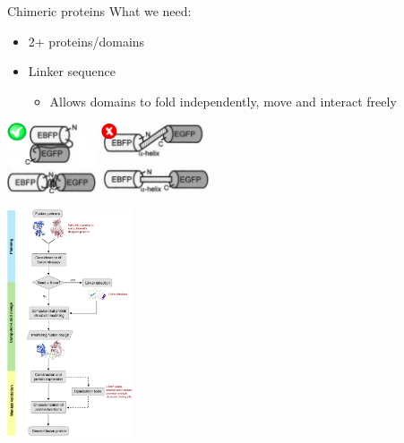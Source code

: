 \documentclass{beamer}
\begin{document}
\begin{frame}{Chimeric proteins}
What we need:
\begin{itemize}
 \item 2+ proteins/domains
 \item Linker sequence
 \begin{itemize}
    \pause
    \item Allows domains to fold independently, move and interact freely
\end{itemize}
\end{itemize}
\vspace{20px}
\pause
\hspace{20px}
\includegraphics[width=100px]{../img/linkerOk-sign.png}
\hspace{40px}
\pause
\includegraphics[width=120px]{../img/linkerBad-sign.png}
\end{frame}




\begin{frame}[plain]
\begin{center}
\includegraphics[width=140px]{../img/esquemaProcesoFusion.jpg}
\end{center}
\end{frame}
\end{document}
